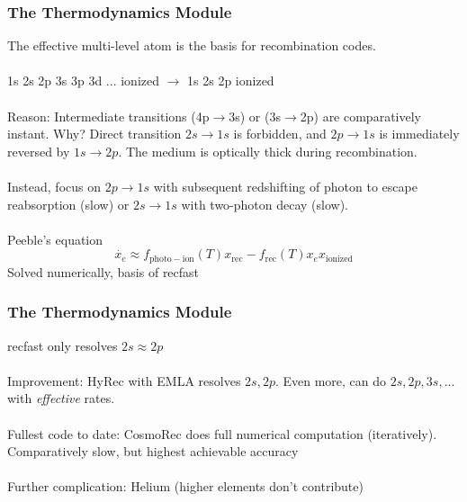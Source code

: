 \begin{frame}[fragile]
\frametitle{The Thermodynamics Module}

The {\Red effective multi-level atom} is the basis for recombination codes.\\ \mbox{}\\

1s 2s 2p 3s 3p 3d ... ionized $\to$ 1s 2s 2p ionized \\ \mbox{}\\

\pause
Reason: Intermediate transitions (4p$\to$3s) or (3s$\to$2p) are comparatively instant. Why? Direct transition $2s \to 1s$ is forbidden, and $2p \to 1s$ is immediately reversed by $1s \to 2p$. The medium is {\Red optically thick} during recombination.\\ \mbox{}\\

\pause
Instead, focus on $2p \to 1s$ with subsequent redshifting of photon to escape reabsorption (slow) or $2s \to 1s$ with two-photon decay (slow). \\ \mbox{}\\

{\Red Peeble's equation}
\begin{equation}
	\dot{x_e} \approx f_\mathrm{photo-ion}(T) x_\mathrm{rec}-f_\mathrm{rec}(T) x_e x_\mathrm{ionized} 
\end{equation}
Solved numerically, basis of {\Red recfast}
\end{frame}



\begin{frame}[fragile]
	\frametitle{The Thermodynamics Module}
	
	{\Red recfast} only resolves $2s \approx 2p$\\ \mbox{}\\
	\pause
	Improvement: {\Red HyRec} with EMLA resolves $2s,2p$. Even more, can do $2s,2p,3s,...$ with \textit{effective} rates.\\ \mbox{}\\
	
	Fullest code to date: {\Red CosmoRec} does full numerical computation (iteratively). Comparatively slow, but highest achievable accuracy\\ \mbox{}\\
	
	\pause
	Further complication: Helium (higher elements don't contribute)\\
\end{frame}


